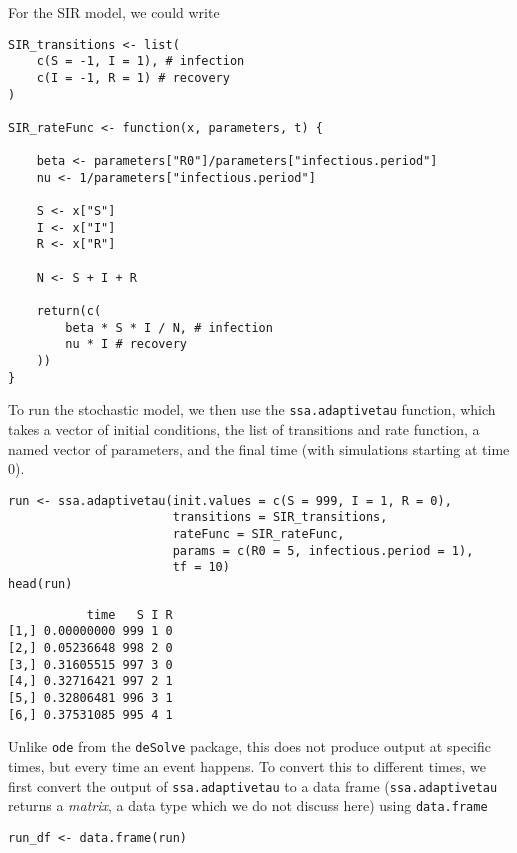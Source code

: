 \documentclass[11pt,a4paper]{article}
\begin{document}
For the SIR model, we could write \\

\begin{verbatim}
SIR_transitions <- list(
    c(S = -1, I = 1), # infection
    c(I = -1, R = 1) # recovery
)

SIR_rateFunc <- function(x, parameters, t) {

    beta <- parameters["R0"]/parameters["infectious.period"]
    nu <- 1/parameters["infectious.period"]

    S <- x["S"]
    I <- x["I"]
    R <- x["R"]

    N <- S + I + R

    return(c(
        beta * S * I / N, # infection
        nu * I # recovery
    ))
}
\end{verbatim}

To run the stochastic model, we then use the \verb~ssa.adaptivetau~ function, which takes a vector of initial conditions, the list of transitions and rate function, a named vector of parameters, and the final time (with simulations starting at time 0). \\

\begin{verbatim}
run <- ssa.adaptivetau(init.values = c(S = 999, I = 1, R = 0),
                       transitions = SIR_transitions,
                       rateFunc = SIR_rateFunc,
                       params = c(R0 = 5, infectious.period = 1),
                       tf = 10)
head(run)
\end{verbatim}

\begin{verbatim}
           time   S I R
[1,] 0.00000000 999 1 0
[2,] 0.05236648 998 2 0
[3,] 0.31605515 997 3 0
[4,] 0.32716421 997 2 1
[5,] 0.32806481 996 3 1
[6,] 0.37531085 995 4 1
\end{verbatim}

Unlike \texttt{ode} from the \texttt{deSolve} package, this does not produce output at specific times, but every time an event happens. To convert this to different times, we first convert the output of \texttt{ssa.adaptivetau} to a data frame (\texttt{ssa.adaptivetau} returns a \emph{matrix}, a data type which we do not discuss here) using \texttt{data.frame} \\

\begin{verbatim}
run_df <- data.frame(run)
\end{verbatim}
\end{document}
